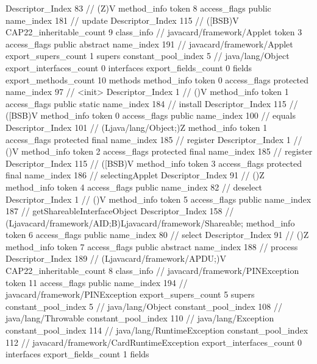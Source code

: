 {{{{{					Descriptor_Index	83		// (Z)V
				}
				method_info {
					token	8
					access_flags	public
					name_index	181		// update
					Descriptor_Index	115		// ([BSB)V
				}
			}
			CAP22_inheritable_count	9
		}
		class_info {		// javacard/framework/Applet
			token	3
			access_flags	public abstract
			name_index	191		// javacard/framework/Applet
			export_supers_count	1
			supers {
				constant_pool_index	5		// java/lang/Object
			}
			export_interfaces_count	0
			interfaces {
			}
			export_fields_count	0
			fields {
			}
			export_methods_count	10
			methods {
				method_info {
					token	0
					access_flags	protected
					name_index	97		// <init>
					Descriptor_Index	1		// ()V
				}
				method_info {
					token	1
					access_flags	public static
					name_index	184		// install
					Descriptor_Index	115		// ([BSB)V
				}
				method_info {
					token	0
					access_flags	public
					name_index	100		// equals
					Descriptor_Index	101		// (Ljava/lang/Object;)Z
				}
				method_info {
					token	1
					access_flags	protected final
					name_index	185		// register
					Descriptor_Index	1		// ()V
				}
				method_info {
					token	2
					access_flags	protected final
					name_index	185		// register
					Descriptor_Index	115		// ([BSB)V
				}
				method_info {
					token	3
					access_flags	protected final
					name_index	186		// selectingApplet
					Descriptor_Index	91		// ()Z
				}
				method_info {
					token	4
					access_flags	public
					name_index	82		// deselect
					Descriptor_Index	1		// ()V
				}
				method_info {
					token	5
					access_flags	public
					name_index	187		// getShareableInterfaceObject
					Descriptor_Index	158		// (Ljavacard/framework/AID;B)Ljavacard/framework/Shareable;
				}
				method_info {
					token	6
					access_flags	public
					name_index	80		// select
					Descriptor_Index	91		// ()Z
				}
				method_info {
					token	7
					access_flags	public abstract
					name_index	188		// process
					Descriptor_Index	189		// (Ljavacard/framework/APDU;)V
				}
			}
			CAP22_inheritable_count	8
		}
		class_info {		// javacard/framework/PINException
			token	11
			access_flags	public
			name_index	194		// javacard/framework/PINException
			export_supers_count	5
			supers {
				constant_pool_index	5		// java/lang/Object
				constant_pool_index	108		// java/lang/Throwable
				constant_pool_index	110		// java/lang/Exception
				constant_pool_index	114		// java/lang/RuntimeException
				constant_pool_index	112		// javacard/framework/CardRuntimeException
			}
			export_interfaces_count	0
			interfaces {
			}
			export_fields_count	1
			fields {
}}}}
